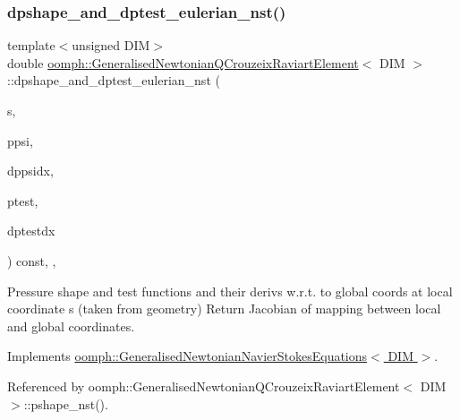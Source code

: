 \subsubsection{\texorpdfstring{dpshape\+\_\+and\+\_\+dptest\+\_\+eulerian\+\_\+nst()}{dpshape\_and\_dptest\_eulerian\_nst()}\hspace{0.1cm}{\footnotesize\ttfamily [1/3]}}
{\footnotesize\ttfamily template$<$unsigned D\+IM$>$ \\
double \hyperlink{classoomph_1_1GeneralisedNewtonianQCrouzeixRaviartElement}{oomph\+::\+Generalised\+Newtonian\+Q\+Crouzeix\+Raviart\+Element}$<$ D\+IM $>$\+::dpshape\+\_\+and\+\_\+dptest\+\_\+eulerian\+\_\+nst (\begin{DoxyParamCaption}\item[{const \hyperlink{classoomph_1_1Vector}{Vector}$<$ double $>$ \&}]{s,  }\item[{\hyperlink{classoomph_1_1Shape}{Shape} \&}]{ppsi,  }\item[{\hyperlink{classoomph_1_1DShape}{D\+Shape} \&}]{dppsidx,  }\item[{\hyperlink{classoomph_1_1Shape}{Shape} \&}]{ptest,  }\item[{\hyperlink{classoomph_1_1DShape}{D\+Shape} \&}]{dptestdx }\end{DoxyParamCaption}) const\hspace{0.3cm}{\ttfamily [inline]}, {\ttfamily [protected]}, {\ttfamily [virtual]}}



Pressure shape and test functions and their derivs w.\+r.\+t. to global coords at local coordinate s (taken from geometry) Return Jacobian of mapping between local and global coordinates. 



Implements \hyperlink{classoomph_1_1GeneralisedNewtonianNavierStokesEquations_a00027d27dfdf3c0b72b0d1df9addfdc8}{oomph\+::\+Generalised\+Newtonian\+Navier\+Stokes\+Equations$<$ D\+I\+M $>$}.



Referenced by oomph\+::\+Generalised\+Newtonian\+Q\+Crouzeix\+Raviart\+Element$<$ D\+I\+M $>$\+::pshape\+\_\+nst().

\mbox{\label{classoomph_1_1GeneralisedNewtonianQCrouzeixRaviartElement_a832cb3cfcd2ea1ea15859cb656eaadc9}} 
